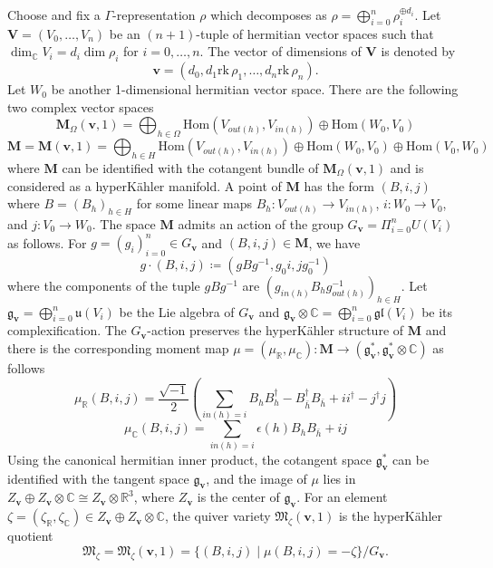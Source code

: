 \documentclass{amsart}[12pt]
\theoremstyle{definition}
\theoremstyle{remark}
\numberwithin{equation}{section}
\begin{document}
Choose and fix a $\Gamma$-representation $\rho$ which decomposes as $\rho = \bigoplus_{i = 0}^n \rho_i^{\oplus d_i}$. Let $\mathbf{V} = (V_0, \dots, V_n)$ be an $(n + 1)$-tuple of hermitian vector spaces such that $\dim_{\mathbb{C}} V_i = d_i \dim \rho_i$ for $i = 0, \dots, n$. The vector of dimensions of $\mathbf{V}$ is denoted by 
\[
\mathbf{v} = (d_0, d_1 \mathrm{rk}\, \rho_1, \dots, d_n \mathrm{rk}\, \rho_n).
\]
Let $W_0$ be another 1-dimensional hermitian vector space. There are the following two complex vector spaces
\[
\mathbf{M}_{\Omega}(\mathbf{v}, 1) = \bigoplus_{h \in \Omega} \mathrm{Hom} (V_{out (h)}, V_{in (h)}) \oplus  \mathrm{Hom} (W_{0}, V_0)
\]
\[
\mathbf{M} = \mathbf{M}(\mathbf{v}, 1) = \bigoplus_{h \in H} \mathrm{Hom} (V_{out (h)}, V_{in (h)}) \oplus \mathrm{Hom} (W_{0}, V_0) \oplus \mathrm{Hom} (V_{0}, W_0)
\]
where $\mathbf{M}$ can be identified with the cotangent bundle of $\mathbf{M}_{\Omega}(\mathbf{v}, 1)$ and is considered as a hyperK\"ahler manifold. A point of $\mathbf{M}$ has the form $(B, i, j)$ where $B = (B_h)_{h \in H}$ for some linear maps $B_h: V_{out (h)} \to V_{in (h)}$, $i: W_0 \to V_0$, and $j: V_0 \to W_0$. The space $\mathbf{M}$ admits an action of the group $G_{\mathbf{v}} = \Pi_{i = 0}^n U(V_i)$ as follows. For $g = (g_i)_{i = 0}^n \in G_{\mathbf{v}}$ and $(B, i, j) \in \mathbf{M}$, we have
\[
g \cdot (B, i, j) \coloneqq (gBg^{-1}, g_0i, jg_0^{-1})
\]
where the components of the tuple $gBg^{-1}$ are $(g_{in (h)}B_hg_{out (h)}^{-1})_{h \in H}$. Let $\mathfrak{g}_{\mathbf{v}} = \bigoplus_{i = 0}^n \mathfrak{u}(V_i)$ be the Lie algebra of $G_{\mathbf{v}}$ and $\mathfrak{g}_{\mathbf{v}} \otimes \mathbb{C} = \bigoplus_{i = 0}^n \mathfrak{gl}(V_i)$ be its complexification. The $G_{\mathbf{v}}$-action preserves the hyperK\"ahler structure of $\mathbf{M}$ and there is the corresponding moment map $\mu = (\mu_{\mathbb{R}}, \mu_{\mathbb{C}}): \mathbf{M} \to (\mathfrak{g}^*_{\mathbf{v}}, \mathfrak{g}^*_{\mathbf{v}} \otimes \mathbb{C})$ as follows
\[
\mu_{\mathbb{R}} (B, i, j) = \dfrac{\sqrt{-1}}{2} \left( \sum_{in (h) = i} B_h B_h^{\dagger} - B_{\bar{h}}^{\dagger} B_{\bar{h}} + ii^{\dagger} - j^{\dagger}j\right)
\]
\[
\mu_{\mathbb{C}} (B, i, j) = \sum_{in (h) = i} \epsilon(h)B_h B_{\bar{h}} + ij
\]
Using the canonical hermitian inner product, the cotangent space $\mathfrak{g}^*_{\mathbf{v}}$ can be identified with the tangent space $\mathfrak{g}_{\mathbf{v}}$, and the image of $\mu$ lies in $Z_{\mathbf{v}} \oplus Z_{\mathbf{v}} \otimes \mathbb{C} \cong Z_{\mathbf{v}} \otimes \mathbb{R}^3$, where $Z_{\mathbf{v}}$ is the center of $\mathfrak{g}_{\mathbf{v}}$. For an element $\zeta = (\zeta_{\mathbb{R}}, \zeta_{\mathbb{C}}) \in Z_{\mathbf{v}} \oplus Z_{\mathbf{v}} \otimes \mathbb{C}$, the quiver variety $\mathfrak{M}_{\zeta}(\mathbf{v}, 1)$ is the hyperK\"ahler quotient
\[
\mathfrak{M}_{\zeta} = \mathfrak{M}_{\zeta}(\mathbf{v}, 1) = \{(B, i, j) \mid \mu (B, i, j) = -\zeta\}/G_{\mathbf{v}}. 
\]
\end{document}
